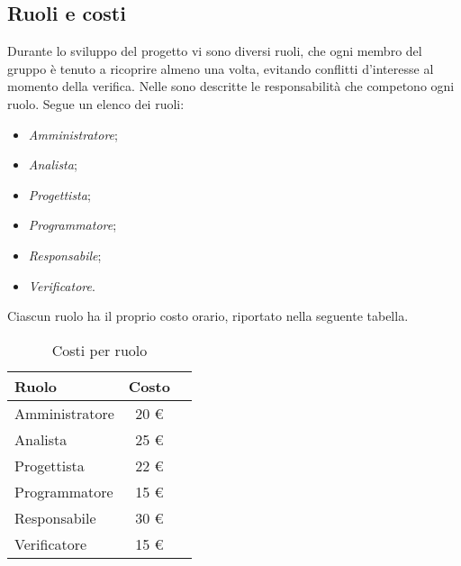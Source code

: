 	\subsection{Ruoli e costi}
	
	Durante lo sviluppo del progetto vi sono diversi ruoli, che ogni membro del gruppo \GroupName{} è tenuto a ricoprire almeno una volta, evitando conflitti d'interesse al momento della verifica. Nelle \NormeDiProgetto sono descritte le responsabilità che competono ogni ruolo. Segue un elenco dei ruoli:
	\begin{itemize}
	\item \textit{Amministratore};
	\item \textit{Analista};
	\item \textit{Progettista};
	\item \textit{Programmatore};
	\item \textit{Responsabile};
	\item \textit{Verificatore}.
	\end{itemize}
	Ciascun ruolo ha il proprio costo orario, riportato nella seguente tabella.
	\label{tabellacostiruolo}
	\begin{table}[h]
	\centering
	\begin{tabular}{ l c l }
	\hline
	\textbf{Ruolo} & \textbf{Costo} \\
	\hline
	Amministratore & 20 € \\
	Analista & 25 € \\
	Progettista & 22 € \\
	Programmatore & 15 € \\
	Responsabile & 30 € \\
	Verificatore & 15 €\\
	\hline
	\end{tabular}
	\caption{Costi per ruolo}
	\end{table}


